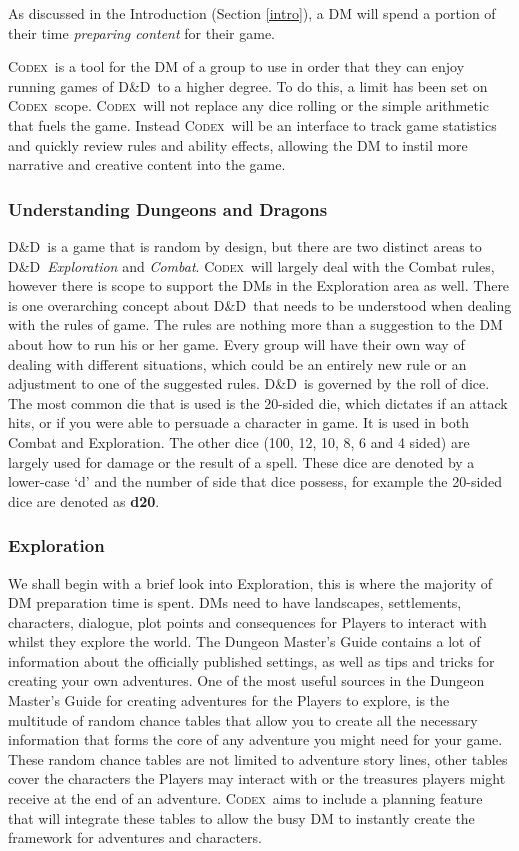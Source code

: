 \documentclass[review]{cmpreport}
\newcommand{\dnd}{D\&D}
\newcommand{\Codex}{\textsc{Codex}}
\begin{document}
	As discussed in the Introduction (Section \ref{intro}), a DM will spend a portion of their time \emph{preparing content} for their game. 
	
	\Codex \ is a tool for the DM of a group to use in order that they can enjoy running games of \dnd \ to a higher degree. To do this, a limit has been set on \Codex \ scope. \Codex \ will not replace any dice rolling or the simple arithmetic that fuels the game. Instead \Codex \ will be an interface to track game statistics and quickly review rules and ability effects,  allowing the DM to instil more narrative and creative content into the game.
	
	\subsubsection{Understanding Dungeons and Dragons}
	\dnd \ is a game that is random by design, but there are two distinct areas to \dnd \, \emph{Exploration} and \emph{Combat}. \Codex \ will largely deal with the Combat rules, however there is scope to support the DMs in the Exploration area as well. There is one overarching concept about \dnd \ that needs to be understood when dealing with the rules of game. The rules are nothing more than a suggestion to the DM about how to run his or her game. Every group will have their own way of dealing with different situations, which could be an entirely new rule or an adjustment to one of the suggested rules. \dnd \ is governed by the roll of dice. The most common die that is used is the 20-sided die, which dictates if an attack hits, or if you were able to persuade a character in game. It is used in both Combat and Exploration. The other dice (100, 12, 10, 8, 6 and 4 sided) are largely used for damage or the result of a spell. These dice are denoted by a lower-case `d' and the number of side that dice possess, for example the 20-sided dice are denoted as \textbf{d20}.
	
	\subsubsection{Exploration} \label{DnDExplore}
	We shall begin with a brief look into Exploration, this is where the majority of DM preparation time is spent. DMs need to have landscapes, settlements, characters, dialogue, plot points and consequences for Players to interact with whilst they explore the world. The Dungeon Master's Guide \citep{DMGuide} contains a lot of information about the officially published settings, as well as tips and tricks for creating your own adventures. One of the most useful sources in the Dungeon Master's Guide for creating adventures for the Players to explore, is the multitude of random chance tables that allow you to create all the necessary information that forms the core of any adventure you might need for your game. These random chance tables are not limited to adventure story lines, other tables cover the characters the Players may interact with or the treasures players might receive at the end of an adventure. \Codex \ aims to include a planning feature that will integrate these tables to allow the busy DM to instantly create the framework for adventures and characters. 
	
\end{document}
